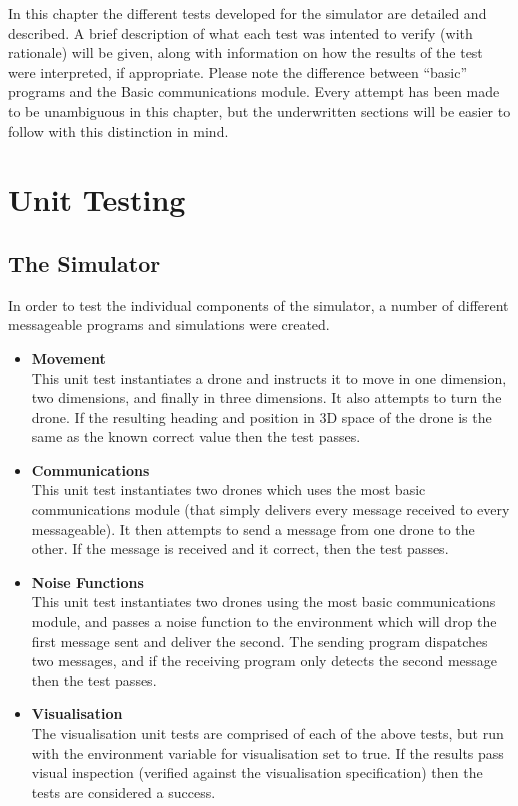 In this chapter the different tests developed for the simulator are detailed and described. A brief description of what each test was intented to verify (with rationale) will be given, along with information on how the results of the test were interpreted, if appropriate. Please note the difference between ``basic'' programs and the Basic communications module. Every attempt has been made to be unambiguous in this chapter, but the underwritten sections will be easier to follow with this distinction in mind.

\section{Unit Testing}

\subsection{The Simulator}
In order to test the individual components of the simulator, a number of different messageable programs and simulations were created.

\begin{itemize}
\item \textbf{Movement} \\
This unit test instantiates a drone and instructs it to move in one dimension, two dimensions, and finally in three dimensions. It also attempts to turn the drone. If the resulting heading and position in 3D space of the drone is the same as the known correct value then the test passes.

\item \textbf{Communications} \\
This unit test instantiates two drones which uses the most basic communications module (that simply delivers every message received to every messageable). It then attempts to send a message from one drone to the other. If the message is received and it correct, then the test passes.

\item \textbf{Noise Functions} \\
This unit test instantiates two drones using the most basic communications module, and passes a noise function to the environment which will drop the first message sent and deliver the second. The sending program dispatches two messages, and if the receiving program only detects the second message then the test passes.

\item \textbf{Visualisation} \\
The visualisation unit tests are comprised of each of the above tests, but run with the environment variable for visualisation set to true. If the results pass visual inspection (verified against the visualisation specification) then the tests are considered a success.
\end{itemize}

